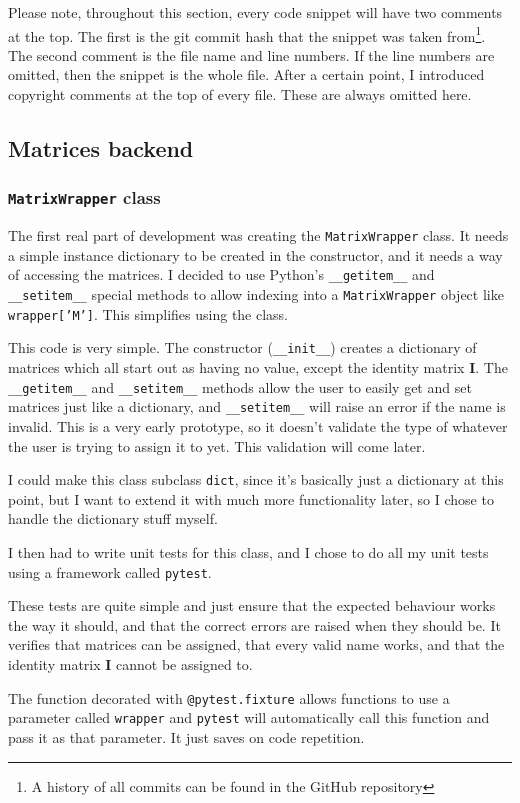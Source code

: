 \documentclass[../main.tex]{subfiles}
\begin{document}
Please note, throughout this section, every code snippet will have two comments at the top. The first is the git commit hash that the snippet was taken from\footnote{A history of all commits can be found in the GitHub repository\cite{lintrans-github}}. The second comment is the file name and line numbers. If the line numbers are omitted, then the snippet is the whole file. After a certain point, I introduced copyright comments at the top of every file. These are always omitted here.

\subsection{Matrices backend\label{subsection:development:matrices-backend}}

\subsubsection{\texttt{MatrixWrapper} class}

The first real part of development was creating the \texttt{MatrixWrapper} class. It needs a simple instance dictionary to be created in the constructor, and it needs a way of accessing the matrices. I decided to use Python's \texttt{\_\_getitem\_\_} and \texttt{\_\_setitem\_\_} special methods\cite{python-3-special-methods} to allow indexing into a \texttt{MatrixWrapper} object like \texttt{wrapper['M']}. This simplifies using the class.

This code is very simple. The constructor (\texttt{\_\_init\_\_}) creates a dictionary of matrices which all start out as having no value, except the identity matrix \textbf{I}. The \texttt{\_\_getitem\_\_} and \texttt{\_\_setitem\_\_} methods allow the user to easily get and set matrices just like a dictionary, and \texttt{\_\_setitem\_\_} will raise an error if the name is invalid. This is a very early prototype, so it doesn't validate the type of whatever the user is trying to assign it to yet. This validation will come later.

I could make this class subclass \texttt{dict}, since it's basically just a dictionary at this point, but I want to extend it with much more functionality later, so I chose to handle the dictionary stuff myself.

I then had to write unit tests for this class, and I chose to do all my unit tests using a framework called \texttt{pytest}.

These tests are quite simple and just ensure that the expected behaviour works the way it should, and that the correct errors are raised when they should be. It verifies that matrices can be assigned, that every valid name works, and that the identity matrix \textbf{I} cannot be assigned to.

The function decorated with \texttt{@pytest.fixture} allows functions to use a parameter called \texttt{wrapper} and \texttt{pytest} will automatically call this function and pass it as that parameter. It just saves on code repetition.
\end{document}
